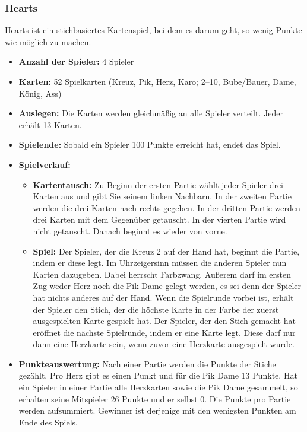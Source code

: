 \documentclass[titlepage,10pt,a4paper]{article}
\begin{document}
\subsubsection{Hearts}
Hearts ist ein stichbasiertes Kartenspiel, bei dem es darum geht, so wenig Punkte wie möglich zu machen.
\begin{itemize}
	\item \textbf{Anzahl der Spieler:} 4 Spieler
	\item \textbf{Karten:}  52 Spielkarten (Kreuz, Pik, Herz, Karo; 2–10, Bube/Bauer, Dame, König, Ass)
	\item \textbf{Auslegen:} Die Karten werden gleichmäßig an alle Spieler verteilt. Jeder erhält 13 Karten.
	\item \textbf{Spielende:} Sobald ein Spieler 100 Punkte erreicht hat, endet das Spiel.
	\item \textbf{Spielverlauf:}
	\begin{itemize}
		\item \textbf{Kartentausch:} Zu Beginn der ersten \gls{Partie} wählt jeder Spieler drei Karten aus und gibt Sie seinem linken Nachbarn. In der zweiten \gls{Partie} werden die drei Karten nach rechts gegeben. In der dritten \gls{Partie} werden drei Karten mit dem Gegenüber getauscht. In der vierten \gls{Partie} wird nicht getauscht. Danach beginnt es wieder von vorne.
		\item \textbf{Spiel:} Der Spieler, der die Kreuz 2 auf der Hand hat, beginnt die \gls{Partie}, indem er diese legt. Im Uhrzeigersinn müssen die anderen Spieler nun Karten dazugeben. Dabei herrscht \gls{Farbzwang}. Außerem darf im ersten Zug weder Herz noch die Pik Dame gelegt werden, es sei denn der Spieler hat nichts anderes auf der Hand. Wenn die \gls{Spielrunde} vorbei ist, erhält der Spieler den \gls{Stich}, der die höchste Karte in der Farbe der zuerst ausgespielten Karte gespielt hat. Der Spieler, der den \gls{Stich} gemacht hat eröffnet die nächste \gls{Spielrunde}, indem er eine Karte legt. Diese darf nur dann eine Herzkarte sein, wenn zuvor eine Herzkarte ausgespielt wurde.
	\end{itemize}
	\item \textbf{Punkteauswertung:} Nach einer \gls{Partie} werden die Punkte der \gls{Stich}e gezählt. Pro Herz gibt es einen Punkt und für die Pik Dame 13 Punkte. Hat ein Spieler in einer \gls{Partie} alle Herzkarten sowie die Pik Dame gesammelt, so erhalten seine Mitspieler 26 Punkte und er selbst 0. Die Punkte pro Partie werden aufsummiert. Gewinner ist derjenige mit den wenigsten Punkten am Ende des Spiels.
\end{itemize}
\end{document}
